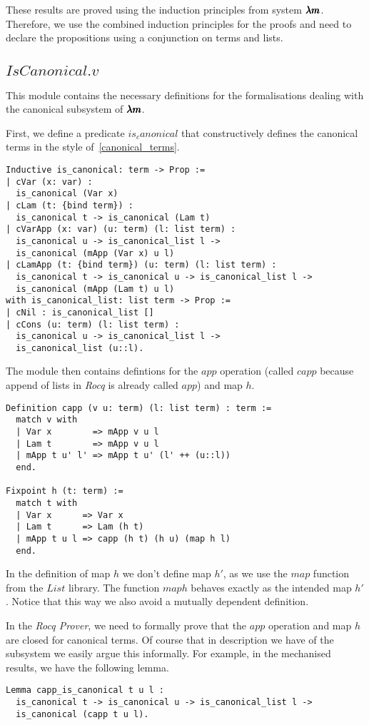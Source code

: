 These results are proved using the induction principles from system $\pmb{\lambda m}$.
Therefore, we use the combined induction principles for the proofs and need to declare the propositions using a conjunction on terms and lists.

\subsection{\lst$IsCanonical.v$}

This module contains the necessary definitions for the formalisations dealing with the canonical subsystem of $\pmb{\lambda m}$.

First, we define a predicate \lst$is_canonical$ that constructively defines the canonical terms in the style of~\cref{canonical_terms}.
\begin{lstlisting}[language=Coq]
Inductive is_canonical: term -> Prop :=
| cVar (x: var) :
  is_canonical (Var x)
| cLam (t: {bind term}) :
  is_canonical t -> is_canonical (Lam t)
| cVarApp (x: var) (u: term) (l: list term) :
  is_canonical u -> is_canonical_list l ->
  is_canonical (mApp (Var x) u l)
| cLamApp (t: {bind term}) (u: term) (l: list term) :
  is_canonical t -> is_canonical u -> is_canonical_list l ->
  is_canonical (mApp (Lam t) u l)
with is_canonical_list: list term -> Prop :=
| cNil : is_canonical_list []
| cCons (u: term) (l: list term) :
  is_canonical u -> is_canonical_list l ->
  is_canonical_list (u::l).
\end{lstlisting}

The module then contains defintions for the $app$ operation (called \lst$capp$ because append of lists in \textit{Rocq} is already called \lst$app$) and map $h$.
\begin{lstlisting}[language=Coq]
Definition capp (v u: term) (l: list term) : term :=
  match v with
  | Var x        => mApp v u l
  | Lam t        => mApp v u l
  | mApp t u' l' => mApp t u' (l' ++ (u::l))
  end.

Fixpoint h (t: term) :=
  match t with
  | Var x      => Var x
  | Lam t      => Lam (h t)
  | mApp t u l => capp (h t) (h u) (map h l)
  end.
\end{lstlisting}
In the definition of map $h$ we don't define map $h'$, as we use the \lst$map$ function from the \lst$List$ library.
The function \lst$map h$ behaves exactly as the intended map $h'$.
Notice that this way we also avoid a mutually dependent definition.

In the \textit{Rocq Prover}, we need to formally prove that the $app$ operation and map $h$ are closed for canonical terms.
Of course that in description we have of the subsystem we easily argue this informally. For example, in the mechanised results, we have the following lemma.
\begin{lstlisting}[language=Coq]
Lemma capp_is_canonical t u l :
  is_canonical t -> is_canonical u -> is_canonical_list l ->
  is_canonical (capp t u l).
\end{lstlisting}

